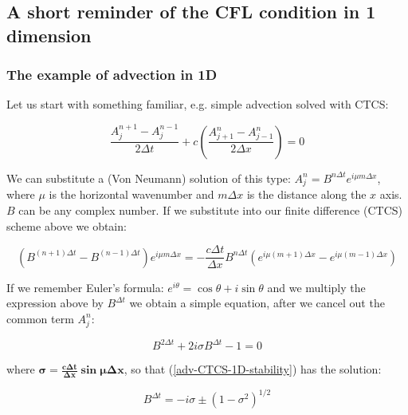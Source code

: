 \documentclass[xcolor=dvipsnames]{beamer} %
\newcommand{\BSS}{ \begin{scriptsize}}
\newcommand{\ESS}{ \end{scriptsize}}
\begin{document}
\subsection{A short reminder of the CFL condition in 1 dimension}
\frame
{
	\frametitle{The example of advection in 1D}
	\BSS
	Let us start with something familiar, e.g. simple advection solved with CTCS:
	
	\begin{equation}
		\frac {A_j^{n+1}-A_j^{n-1}}{ 2 \Delta t} +c \left(  \frac {A_{j+1}^{n}-A_{j-1}^{n}}{ 2 \Delta x}  \right) = 0
		\label{adv-CTCS-1D}
	\end{equation}
	
	We can substitute a (Von Neumann) solution of this type: ${A_j^{n}=B^{n \Delta t} e^{i \mu m \Delta x}}$, where $\mu$ is the horizontal wavenumber and $m \Delta x$ is the distance along the $x$ axis. $B$ can be any complex number. If we substitute into our finite difference (CTCS) scheme above we obtain:
	
	\begin{equation}
		\left ( B^{(n+1)\Delta t}-B^{(n-1) \Delta t} \right ) e^{i \mu m \Delta x} = - \frac {c \Delta t}{\Delta x} B^{n \Delta t} \left( e^{i \mu (m+1) \Delta x}  - e^{i \mu (m-1) \Delta x}  \right)
		\label{adv-CTCS-1D-solution}
	\end{equation}
	
	If we remember Euler's formula: $e^{i \theta}=\cos \theta +i \sin \theta$ and we multiply the expression above by $B^{\Delta t}$ we obtain a simple equation, after we cancel out the common term $A_j^{n}$:
	
	\begin{equation}
		B^{2 \Delta t}    + 2 i \sigma B^{\Delta t}  -1 = 0  
		\label{adv-CTCS-1D-stability}
	\end{equation}
	
	where $\mathbf{\sigma = \frac {c \Delta t}{\Delta x} \sin \mu \Delta x}$, so that (\ref{adv-CTCS-1D-stability}) has the solution:
	
	\begin{equation}
		B^{\Delta t} = -i \sigma \pm \left( 1 - \sigma^2 \right)^{1/2} 
		\label{adv-CTCS-1D-eigenvalues}
	\end{equation}
	
	\ESS
}
\end{document}
